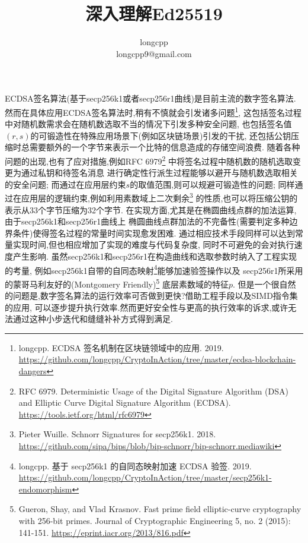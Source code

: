 \documentclass{article}
\begin{document}
\title{深入理解Ed25519}
\author{longcpp \\ \small{longcpp9@gmail.com}}

\maketitle

ECDSA签名算法(基于secp256k1或者secp256r1曲线)是目前主流的数字签名算法.
然而在具体应用ECDSA签名算法时,稍有不慎就会引发诸多问题\footnote{
longcpp. ECDSA 签名机制在区块链领域中的应⽤. 2019.
\url{https://github.com/longcpp/CryptoInAction/tree/master/ecdsa-blockchain-dangers}},
这包括签名过程中对随机数需求会在随机数选取不当的情况下引发多种安全问题,
也包括签名值$(r,s)$的可锻造性在特殊应用场景下(例如区块链场景)引发的干扰,
还包括公钥压缩时总需要额外的一个字节来表示一个比特的信息造成的存储空间浪费.
随着各种问题的出现,也有了应对措施,例如RFC 6979\footnote{
RFC 6979. 
Deterministic Usage of the Digital Signature Algorithm (DSA) and Elliptic Curve Digital Signature Algorithm (ECDSA).
\url{https://tools.ietf.org/html/rfc6979}}
中将签名过程中随机数的随机选取变更为通过私钥和待签名消息
进行确定性行派生过程能够以避开与随机数选取相关的安全问题;
而通过在应用层约束$s$的取值范围,则可以规避可锻造性的问题;
同样通过在应用层的逻辑约束,例如利用素数域上二次剩余\footnote{
Pieter Wuille. Schnorr Signatures for secp256k1. 2018.
\url{https://github.com/sipa/bips/blob/bip-schnorr/bip-schnorr.mediawiki}}
的性质,也可以将压缩公钥的表示从33个字节压缩为32个字节.
在实现方面,尤其是在椭圆曲线点群的加法运算,由于secp256k1和secp256r1曲线上
椭圆曲线点群加法的不完备性(需要判定多种边界条件)使得签名过程的常量时间实现愈发困难.
通过相应技术手段同样可以达到常量实现时间,但也相应增加了实现的难度与代码复杂度,
同时不可避免的会对执行速度产生影响.
虽然secp256k1和secp256r1在构造曲线和选取参数时纳入了工程实现的考量,
例如secp256k1自带的自同态映射\footnote{
longcpp. 基于 secp256k1 的⾃同态映射加速 ECDSA 验签. 2019.
\url{https://github.com/longcpp/CryptoInAction/tree/master/secp256k1-endomorphism}
}能够加速验签操作以及
secp256r1所采用的蒙哥马利友好的(Montgomery Friendly)\footnote{
Gueron, Shay, and Vlad Krasnov. 
Fast prime field elliptic-curve cryptography with 256-bit primes. 
Journal of Cryptographic Engineering 5, no. 2 (2015): 141-151.
\url{https://eprint.iacr.org/2013/816.pdf}}
底层素数域的特征$p$.
但是一个很自然的问题是,数字签名算法的运行效率可否做到更快?借助工程手段以及SIMD指令集的应用,
可以逐步提升执行效率.然而更好安全性与更高的执行效率的诉求,或许无法通过这种小步迭代和缝缝补补方式得到满足.
\end{document}

